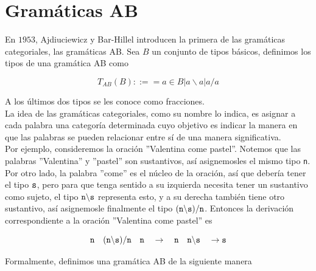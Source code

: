 \documentclass[../main.tex]{subfiles}
\begin{document}
	
	\section{Gramáticas AB}
	
	En $1953$, Ajdiuciewicz y Bar-Hillel introducen la primera de las gramáticas categoriales, las gramáticas AB. Sea $B$  un conjunto de tipos básicos, definimos los tipos de una gramática AB como
	
	$$T_{AB}(B)::==a \in B | a \backslash a | a/a$$
	
	A los últimos dos tipos se les conoce como fracciones. \\
	La idea de las gramáticas categoriales, como su nombre lo indica, es asignar a cada palabra una categoría determinada cuyo objetivo es indicar la manera en que las palabras se pueden relacionar entre sí de una manera significativa. \\
	
	Por ejemplo, consideremos la oración ''Valentina come pastel''. Notemos que las palabras ''Valentina'' y ''pastel'' son sustantivos, así asignemosles el mismo tipo {\tt{n}}. Por otro lado, la palabra ''come'' es el núcleo de la oración, así que debería tener el tipo $\tt{s}$, pero para que tenga sentido a su izquierda necesita tener un sustantivo como sujeto, el tipo $\tt{n\backslash s}$ representa esto, y a su derecha también tiene otro sustantivo, así asignemosle finalmente el tipo $(\tt{n\backslash s})/n$. Entonces la derivación correspondiente a la oración ''Valentina come pastel'' es
	
	$$\tt{n} \quad (\tt{n\backslash s})/n \quad \tt{n} \quad \to \quad \tt{n} \quad \tt{n\backslash s} \quad \to s$$
	
	Formalmente, definimos una gramática AB de la siguiente manera
	
\end{document}
